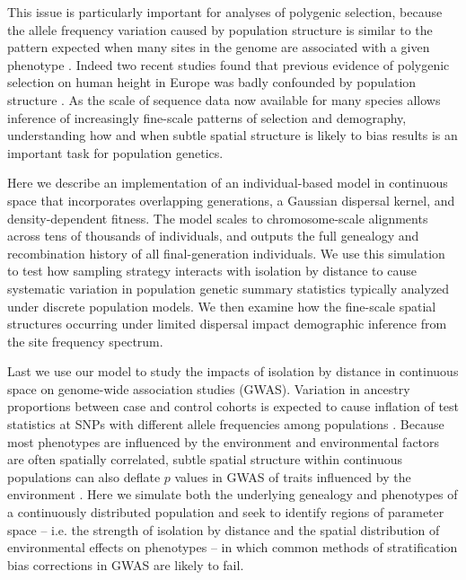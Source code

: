 \documentclass[9pt,twocolumn,twoside,lineno]{gsajnl}
\begin{document}
This issue is particularly important for analyses of polygenic selection, because the allele frequency variation caused by population structure is similar to the pattern expected when many sites in the genome are associated with a given phenotype \citep{Bulik-Sullivan2015}. Indeed two recent studies found that previous evidence of polygenic selection on human height in Europe was badly confounded by population structure \citep{Sohail2018,Berg2018}. As the scale of sequence data now available for many species allows inference of increasingly fine-scale patterns of selection and demography, understanding how and when subtle spatial structure is likely to bias results is an important task for population genetics.

Here we describe an implementation of an individual-based model in continuous space that incorporates overlapping generations, a Gaussian dispersal kernel, and density-dependent fitness. The model scales to chromosome-scale alignments across tens of thousands of individuals, and outputs the full genealogy and recombination history of all final-generation individuals. We use this simulation to test how sampling strategy interacts with isolation by distance to cause systematic variation in population genetic summary statistics typically analyzed under discrete population models. We then examine how the fine-scale spatial structures occurring under limited dispersal impact demographic inference from the site frequency spectrum.

Last we use our model to study the impacts of isolation by distance in continuous space on genome-wide association studies (GWAS). Variation in ancestry proportions between case and control cohorts is expected to cause inflation of test statistics at SNPs with different allele frequencies among populations \citep{Price2006}. Because most phenotypes are influenced by the environment and environmental factors are often spatially correlated, subtle spatial structure within continuous populations can also deflate $p$ values in GWAS of traits influenced by the environment \citep{Mathieson2012}. Here we simulate both the underlying genealogy and phenotypes of a continuously distributed population and seek to identify regions of parameter space -- i.e. the strength of isolation by distance and the spatial distribution of environmental effects on phenotypes -- in which common methods of stratification bias corrections in GWAS are likely to fail. 
\end{document}

